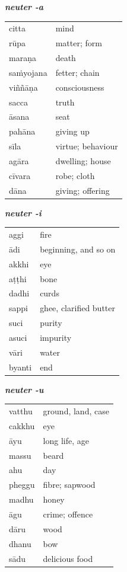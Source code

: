\documentclass[11pt,oneside]{memoir}
\begin{document}
\begin{multicols}{3}
{\centering\textit{\textbf{neuter -a}}\par}

\begin{center}
\begin{tabular}{ll}
citta & mind\\
rūpa & matter; form\\
maraṇa & death\\
saṁyojana & fetter; chain\\
viññāṇa & consciousness\\
sacca & truth\\
āsana & seat\\
pahāna & giving up\\
sīla & virtue; behaviour\\
agāra & dwelling; house\\
cīvara & robe; cloth\\
dāna & giving; offering\\
\end{tabular}
\end{center}

\columnbreak
{\centering\textit{\textbf{neuter -i}}\par}

\begin{center}
\begin{tabular}{ll}
aggi & fire\\
ādi & beginning, and so on\\
akkhi & eye\\
aṭṭhi & bone\\
dadhi & curds\\
sappi & ghee, clarified butter\\
suci & purity\\
asuci & impurity\\
vāri & water\\
byanti & end\\
\end{tabular}
\end{center}

\columnbreak
{\centering\textit{\textbf{neuter -u}}\par}

\begin{center}
\begin{tabular}{ll}
vatthu & ground, land, case\\
cakkhu & eye\\
āyu & long life, age\\
massu & beard\\
ahu & day\\
pheggu & fibre; sapwood\\
madhu & honey\\
āgu & crime; offence\\
dāru & wood\\
dhanu & bow\\
sādu & delicious food\\
\end{tabular}
\end{center}

\end{multicols}
\end{document}
